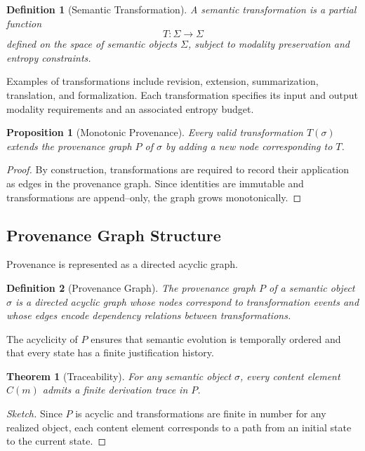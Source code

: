 \documentclass[11pt]{article}
\newtheorem{definition}{Definition}
\newtheorem{proposition}{Proposition}
\newtheorem{theorem}{Theorem}
\begin{document}
\begin{definition}[Semantic Transformation]
A semantic transformation is a partial function
\[
T : \Sigma \rightarrow \Sigma
\]
defined on the space of semantic objects $\Sigma$, subject to modality preservation and
entropy constraints.
\end{definition}

Examples of transformations include revision, extension, summarization, translation, and
formalization. Each transformation specifies its input and output modality requirements
and an associated entropy budget.

\begin{proposition}[Monotonic Provenance]
Every valid transformation $T(\sigma)$ extends the provenance graph $P$ of $\sigma$ by
adding a new node corresponding to $T$.
\end{proposition}

\begin{proof}
By construction, transformations are required to record their application as edges in
the provenance graph. Since identities are immutable and transformations are append--only,
the graph grows monotonically.
\end{proof}

\subsection{Provenance Graph Structure}

Provenance is represented as a directed acyclic graph.

\begin{definition}[Provenance Graph]
The provenance graph $P$ of a semantic object $\sigma$ is a directed acyclic graph whose
nodes correspond to transformation events and whose edges encode dependency relations
between transformations.
\end{definition}

The acyclicity of $P$ ensures that semantic evolution is temporally ordered and that
every state has a finite justification history.

\begin{theorem}[Traceability]
For any semantic object $\sigma$, every content element $C(m)$ admits a finite derivation
trace in $P$.
\end{theorem}

\begin{proof}[Sketch]
Since $P$ is acyclic and transformations are finite in number for any realized object,
each content element corresponds to a path from an initial state to the current state.
\end{proof}
\end{document}
